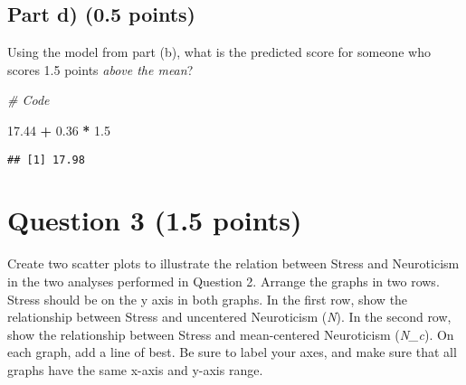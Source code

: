 \documentclass[
]{article}
\newenvironment{Shaded}{\begin{snugshade}}{\end{snugshade}}
\newcommand{\CommentTok}[1]{\textcolor[rgb]{0.56,0.35,0.01}{\textit{#1}}}
\newcommand{\FloatTok}[1]{\textcolor[rgb]{0.00,0.00,0.81}{#1}}
\newcommand{\SpecialCharTok}[1]{\textcolor[rgb]{0.81,0.36,0.00}{\textbf{#1}}}
\begin{document}
\hypertarget{part-d-0.5-points}{%
\subsection{\texorpdfstring{Part d) \textbf{(0.5
points)}}{Part d) (0.5 points)}}\label{part-d-0.5-points}}

Using the model from part (b), what is the predicted score for someone
who scores 1.5 points \emph{above the mean}?

\begin{Shaded}
\begin{Highlighting}[]
\CommentTok{\# Code}

\FloatTok{17.44} \SpecialCharTok{+} \FloatTok{0.36} \SpecialCharTok{*} \FloatTok{1.5}
\end{Highlighting}
\end{Shaded}

\begin{verbatim}
## [1] 17.98
\end{verbatim}

\hypertarget{question-3-1.5-points}{%
\section{\texorpdfstring{Question 3 \textbf{(1.5
points)}}{Question 3 (1.5 points)}}\label{question-3-1.5-points}}

Create two scatter plots to illustrate the relation between Stress and
Neuroticism in the two analyses performed in Question 2. Arrange the
graphs in two rows. Stress should be on the y axis in both graphs. In
the first row, show the relationship between Stress and uncentered
Neuroticism (\emph{N}). In the second row, show the relationship between
Stress and mean-centered Neuroticism (\emph{N\_c}). On each graph, add a
line of best. Be sure to label your axes, and make sure that all graphs
have the same x-axis and y-axis range.
\end{document}
